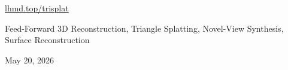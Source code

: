 \documentclass[11pt]{article}
\newcommand{\trkeywords}{Feed-Forward 3D Reconstruction, Triangle Splatting, Novel-View Synthesis, Surface Reconstruction}
\begin{document}
\begin{ziplabtitlebox}
{\setlength{\parskip}{0.1cm}\footnotesize
{\href{https://lhmd.top/trisplat}{lhmd.top/trisplat}\par}
{\trkeywords\par}
{May 20, 2026\par}
}
\end{ziplabtitlebox}

\clearpage










\clearpage
\appendix

\end{document}
